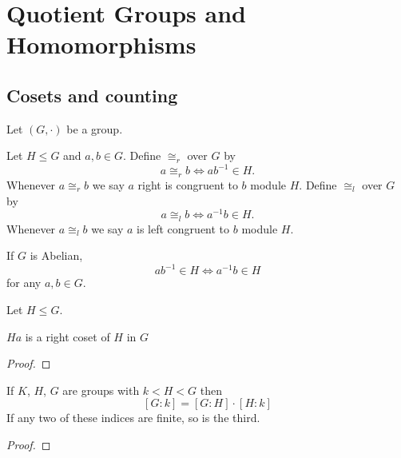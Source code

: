 \documentclass[11pt,a4paper]{article}
\begin{document}
\def\contador{Lesson 6}


\section{Quotient Groups and Homomorphisms}

\subsection{Cosets and counting}

Let \((G,\cdot)\) be a group.


\begin{defi}
Let \(H\leq G\) and \(a,b\in G\).
Define \(\cong_r\) over \(G\) by 
\[a\cong_r b\iff ab^{-1}\in H.\]
Whenever \(a\cong_r b\) we say \(a\) right is congruent to \(b\) module \(H\).
Define \(\cong_l\) over \(G\) by 
\[a\cong_l b\iff a^{-1}b\in H.\]
Whenever \(a\cong_l b\) we say \(a\) is left congruent to \(b\) module \(H\).
\end{defi}

\begin{rem}
    If \(G\) is Abelian, \[ab^{-1}\in H\iff a^{-1}b\in H\]
    for any \(a,b\in G\).
\end{rem}


\begin{teo}
    Let \(H\leq G\).
\end{teo}


\begin{rem}
    \(Ha\) is a right coset of \(H\) in \(G\)
\end{rem}


\begin{proof}
    
\end{proof}


\begin{cor}
    
\end{cor}


\begin{defi}[Index]
    
\end{defi}

\begin{teo}
    If $K$, $H$, $G$ are groups  with $k<H<G$ then
\[
[G: k]=[G: H] \cdot[H: k]
\]
If any two of these indices are finite, so is the third.
\end{teo}


\begin{proof}
    
\end{proof}
\end{document}
